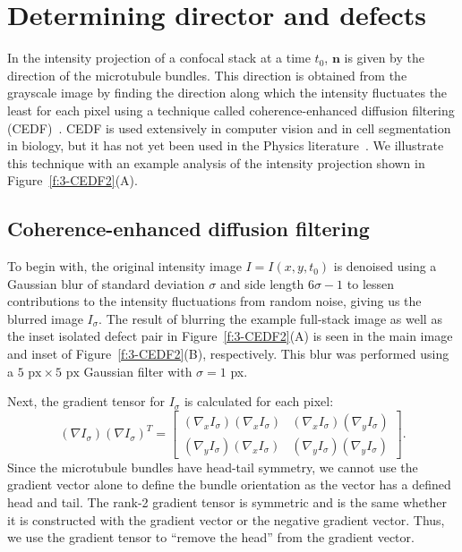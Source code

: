 \section{Determining director and defects}
In the intensity projection of a confocal stack at a time $t_0$, $\mathbf{n}$ is given by the direction of the microtubule bundles.
This direction is obtained from the grayscale image by finding the direction along which the intensity fluctuates the least for each pixel using a technique called coherence-enhanced diffusion filtering (CEDF)~\cite{RN30}.
CEDF is used extensively in computer vision and in cell segmentation in biology, but it has not yet been used in the Physics literature~\cite{RN137}.
We illustrate this technique with an example analysis of the intensity projection shown in Figure~\ref{f:3-CEDF2}(A).


\subsection{Coherence-enhanced diffusion filtering}
To begin with, the original intensity image $I = I(x,y,t_0)$ is denoised using a Gaussian blur of standard deviation $\sigma$ and side length $6 \sigma -1$ to lessen contributions to the intensity fluctuations from random noise, giving us the blurred image $I_{\sigma}$.
The result of blurring the example full-stack image as well as the inset isolated defect pair in Figure~\ref{f:3-CEDF2}(A) is seen in the main image and inset of Figure~\ref{f:3-CEDF2}(B), respectively.
This blur was performed using a $5 \textrm{ px} \times 5 \textrm{ px}$ Gaussian filter with $\sigma= 1$ px.

Next, the gradient tensor for $I_{\sigma}$ is calculated for each pixel:
\begin{equation}
(\nabla I_{\sigma})(\nabla I_{\sigma})^T =
\begin{bmatrix}
(\nabla_x I_{\sigma})(\nabla_x I_{\sigma}) & (\nabla_x I_{\sigma})(\nabla_y I_{\sigma}) \\
(\nabla_y I_{\sigma})(\nabla_x I_{\sigma}) & (\nabla_y I_{\sigma})(\nabla_y I_{\sigma})
\end{bmatrix}.
\end{equation}
Since the microtubule bundles have head-tail symmetry, we cannot use the gradient vector alone to define the bundle orientation as the vector has a defined head and tail.
The rank-2 gradient tensor is symmetric and is the same whether it is constructed with the gradient vector or the negative gradient vector.
Thus, we use the gradient tensor to ``remove the head'' from the gradient vector.

